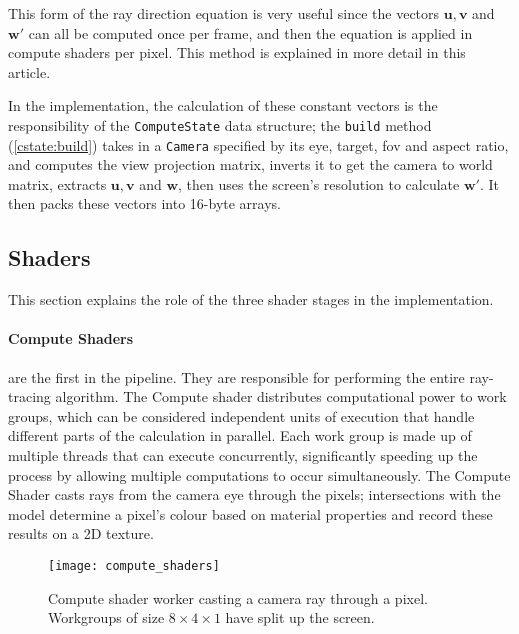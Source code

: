 This form of the ray direction equation is very useful since the vectors $\bm{u}, \bm{v}$ and $\bm{w'}$ can all be computed once per frame, and then the equation is applied in compute shaders per pixel. This method is explained in more detail in this article\supercite{camera_rays}.


In the implementation, the calculation of these constant vectors is the responsibility of the \verb|ComputeState| data structure; the \verb|build| method (\cref{cstate:build}) takes in a \verb|Camera| specified by its eye, target, \acrshort{fov} and aspect ratio, and computes the view projection matrix, inverts it to get the camera to world matrix, extracts $\bm{u}, \bm{v}$ and $\bm{w}$, then uses the screen's resolution to calculate $\bm{w'}$. It then packs these vectors into 16-byte arrays.

\subsection{Shaders}
This section explains the role of the three shader stages in the implementation.

\begin{multicols}{2}
  \paragraph{Compute Shaders} are the first in the pipeline. They are responsible for performing the entire ray-tracing algorithm. The Compute shader distributes computational power to work groups, which can be considered independent units of execution that handle different parts of the calculation in parallel.
  Each work group is made up of multiple threads that can execute concurrently, significantly speeding up the process by allowing multiple computations to occur simultaneously.
  The Compute Shader casts rays from the camera eye through the pixels; intersections with the model determine a pixel's colour based on material properties and record these results on a 2D texture.

  \begin{figure}[H]
    \centering
    \texttt{[image: compute\_shaders]}
    \caption{Compute shader worker casting a camera ray through a pixel. Workgroups of size $8\times4\times1$ have split up the screen.}
  \end{figure}
\end{multicols}
